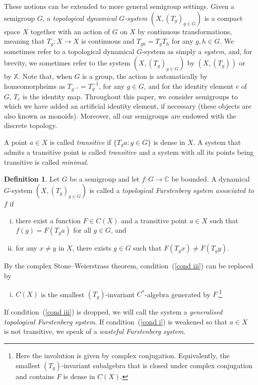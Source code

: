 \documentclass{amsart}
\numberwithin{equation}{section}
\theoremstyle{definition}
\newtheorem{definition}[lemma]{Definition}
\theoremstyle{plain}
\newcommand{\C}{{\mathbb C}}
\begin{document}
These notions can be extended to more general semigroup settings. 
Given a semigroup $G$, a \textit{topological dynamical $G$-system} 
$(X,(T_g)_{g\in G})$ is 
a compact space $X$ together with an action of $G$ on $X$ by 
continuous transformations, meaning that $T_g:X\to X$ is continuous and $T_{gh}=T_gT_h$ for any $g,h\in G$. We sometimes refer to a topological dynamical $G$-system as simply a \textit{system}, and, for brevity, we sometimes refer to the system $(X,(T_g)_{g\in G})$ by $(X,(T_g))$ or by $\mathbb{X}$. Note that, when $G$ is a group, the action is automatically by homeomorphsims as $T_{g^{-1}}=T_{g}^{-1}$, for any $g\in G$, and for the identity element $e$ of $G$, $T_{e}$ is the identity map. 
Throughout this paper, we consider semigroups to which we have added an 
artificial identity element, if necessary (these objects are also known as 
monoids). Moreover, all our semigroups are endowed with the discrete topology. 

A point $a\in X$ is called \textit{transitive} if $\{T_ga: g\in G\}$ is dense in $X$. A system that admits a transitive point is called \textit{transitive} and a system with all its points being transitive is called \textit{minimal}. 

\begin{definition}\label{FS_definition}
Let $G$ be a semigroup and let $f: G \to \C$ be bounded. A dynamical 
$G$-system $(X,(T_g)_{g\in G})$ is called a \emph{topological 
Furstenberg system associated to $f$} if 

\begin{enumerate}[(i)]
    \item \label{cond i} there exist a function $F \in C(X)$ and a transitive point $a \in X$ such that 
    $f(g) = F(T_g a)$ for all $g \in G$, and 
    \item \label{cond iii} for any $x \neq y$ in $X$, there exists $g \in G$ such that 
    $F(T_g x) \neq F(T_g y)$.
\end{enumerate}

By the complex Stone--Weierstrass theorem, condition~(\ref{cond iii}) can be replaced by

\begin{enumerate}[(iii)]
    \item \label{cond ii}   $C(X)$ is the smallest $(T_g)$-invariant $C^{*}$-algebra generated by $F$.\footnote{Here the involution is given by complex conjugation. Equivalently, the smallest $(T_g)$-invariant subalgebra that is closed under complex conjugation and contains $F$ is dense in $C(X)$.} 
\end{enumerate}

If condition~(\ref{cond iii}) is dropped, we will call the system a \emph{generalised topological Furstenberg system}. If condition~(\ref{cond i}) is weakened so that $a\in X$ is not transitive, we speak of a \emph{wasteful Furstenberg system}. 
\end{definition}
\end{document}
